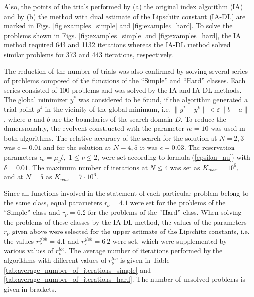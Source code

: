\documentclass[twocolumn]{svjour3}          %
\begin{document}
	Also, the points of the trials performed by (a) the original index algorithm (IA) and by (b) the method with dual estimate of the Lipschitz constant (IA-DL) are marked in Figs. \ref{fig:examples_simple} and \ref{fig:examples_hard}. To solve the problems shown in Figs. \ref{fig:examples_simple} and \ref{fig:examples_hard}, the IA method required 643 and 1132 iterations whereas the IA-DL method solved similar problems for 373 and 443 iterations, respectively.
	
	The reduction of the number of trials was also confirmed by solving several series of  problems composed of the functions of the “Simple” and “Hard” classes. Each series consisted of 100 problems and was solved by the IA and IA-DL methods. The global minimizer $y^{\ast}$ was considered to be found, if the algorithm generated a trial point $y^k$ in the vicinity of the global minimum, i.e. $\| y^{\ast} - y^k \| < \varepsilon \|b - a\|$, where $a$ and $b$ are the boundaries of the search domain $D$. To reduce the dimensionality, the evolvent constructed with the parameter $m=10$ was used in both algorithms. The relative accuracy of the search for the solution at $N = 2, 3$ was $\epsilon=0.01$ and for the solution at $N=4,5$  it was $\epsilon=0.03$. The reservation parameters $\epsilon_{\nu}=\mu_{\nu} \delta,\; 1 \leq \nu \leq 2$, were set according to formula (\ref{epsilon_nu}) with $\delta=0.01$. The maximum number of iterations at $N \leq 4$ was set as $K_{max} = 10^6$, and at $N=5$ as $K_{max}=7 \cdot 10^6$.

	Since all functions involved in the statement of each particular problem belong to the same class, equal parameters $r_{\nu}=4.1$ were set for the problems of the “Simple” class and $r_{\nu}=6.2$ for the problems of the “Hard” class. When solving the problems of these classes by the IA-DL method, the values of the parameters $r_{\nu}$ given above were selected for the upper estimate of the Lipschitz constants, i.e. the values $r_{\nu}^{glob}=4.1$ and $r_{\nu}^{glob}=6.2$ were set, which were supplemented by various values of $r_{\nu}^{loc}$. The average number of iterations performed by the algorithms with different values of $r_{\nu}^{loc}$ is given in Table \ref{tab:average_number_of_iterations_simple} and \ref{tab:average_number_of_iterations_hard}. The number of unsolved problems is given in brackets.
\end{document}

